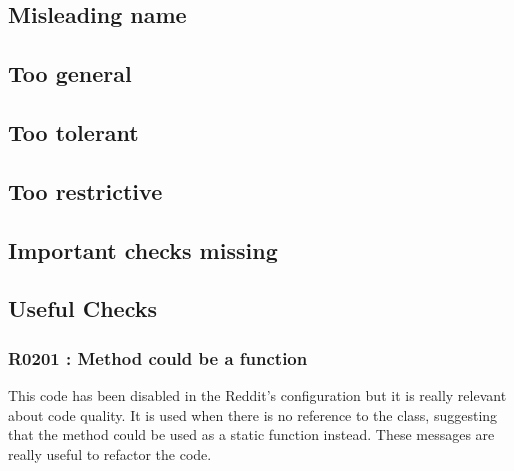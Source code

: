 \documentclass[11pt, a4paper]{article}
\begin{document}
\subsection*{Misleading name}

\subsection*{Too general}

\subsection*{Too tolerant}

\subsection*{Too restrictive}

\subsection*{Important checks missing}

\subsection*{Useful Checks}

\subsubsection*{R0201 : Method could be a function}

This code has been disabled in the Reddit's configuration but it is really relevant about code quality. 
It is used when there is no reference to the class, suggesting that the method could be used as a static function instead.
These messages are really useful to refactor the code.
\end{document}

